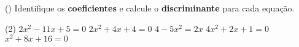 \begin{question} () %
    Identifique os \textbf{coeficientes} e calcule o \textbf{discriminante} para cada equação.
\begin{tasks}(2)
        \task $2x^2-11x+5=0$
        \task $2x^2+4x+4=0$
        \task $4-5x^2=2x$
        \task $4x^2+2x+1=0$
        \task $x^2+8x+16=0$
    \end{tasks}
\end{question}